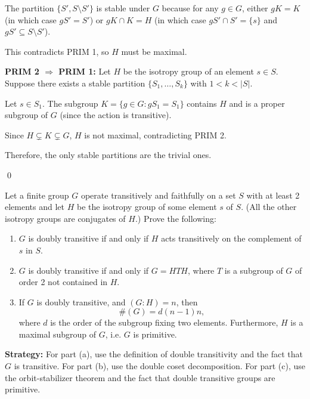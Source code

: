 The partition $\{S', S \setminus S'\}$ is stable under $G$ because for any $g \in G$, either $gK = K$ (in which case $gS' = S'$) or $gK \cap K = H$ (in which case $gS' \cap S' = \{s\}$ and $gS' \subseteq S \setminus S'$).

This contradicts PRIM 1, so $H$ must be maximal.

\textbf{PRIM 2 $\Rightarrow$ PRIM 1:} Let $H$ be the isotropy group of an element $s \in S$. Suppose there exists a stable partition $\{S_1, \ldots, S_k\}$ with $1 < k < |S|$.

Let $s \in S_1$. The subgroup $K = \{g \in G : gS_1 = S_1\}$ contains $H$ and is a proper subgroup of $G$ (since the action is transitive).

Since $H \subsetneq K \subsetneq G$, $H$ is not maximal, contradicting PRIM 2.

Therefore, the only stable partitions are the trivial ones.


\qed
\begin{problembox}
Let a finite group $G$ operate transitively and faithfully on a set $S$ with at least 2 elements and let $H$ be the isotropy group of some element $s$ of $S$. (All the other isotropy groups are conjugates of $H$.) Prove the following:
\begin{enumerate}[label=(\alph*)]
\item $G$ is doubly transitive if and only if $H$ acts transitively on the complement of $s$ in $S$.
\item $G$ is doubly transitive if and only if $G = HTH$, where $T$ is a subgroup of $G$ of order 2 not contained in $H$.
\item If $G$ is doubly transitive, and $(G : H) = n$, then
\[\#(G) = d(n - 1)n,\]
where $d$ is the order of the subgroup fixing two elements. Furthermore, $H$ is a maximal subgroup of $G$, i.e. $G$ is primitive.
\end{enumerate}
\end{problembox}

\noindent\textbf{Strategy:} For part (a), use the definition of double transitivity and the fact that $G$ is transitive. For part (b), use the double coset decomposition. For part (c), use the orbit-stabilizer theorem and the fact that double transitive groups are primitive.

